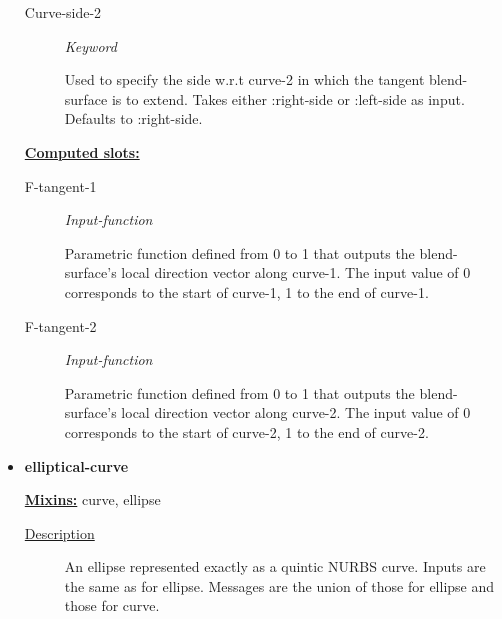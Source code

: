 \documentclass [11pt]{book}
\begin{document}
\begin{itemize}
\begin{description}
\item [Curve-side-2]
\emph{Keyword}

 Used to specify the side w.r.t curve-2 in which the tangent blend-surface is to extend. Takes either :right-side or :left-side as input. Defaults to :right-side.




\end{description}






\textbf{
\underline{Computed slots:}}

\begin{description}

\item [F-tangent-1]
\emph{Input-function}

 Parametric function defined from 0 to 1 that outputs the blend-surface's local direction vector along curve-1. The input value of 0 corresponds to the start of curve-1, 1 to the end of curve-1.




\item [F-tangent-2]
\emph{Input-function}

 Parametric function defined from 0 to 1 that outputs the blend-surface's local direction vector along curve-2. The input value of 0 corresponds to the start of curve-2, 1 to the end of curve-2.




\end{description}







\item {}
\label{prim:elliptical-curve}
\textbf{elliptical-curve}


\textbf{
\underline{Mixins:}} curve, ellipse





\begin{description}

\item [
\underline{Description}]


An ellipse represented exactly as a quintic NURBS curve. Inputs are the same as for ellipse. 
Messages are the union of those for ellipse and those for curve.




\end{description}
\end{itemize}
\end{document}

